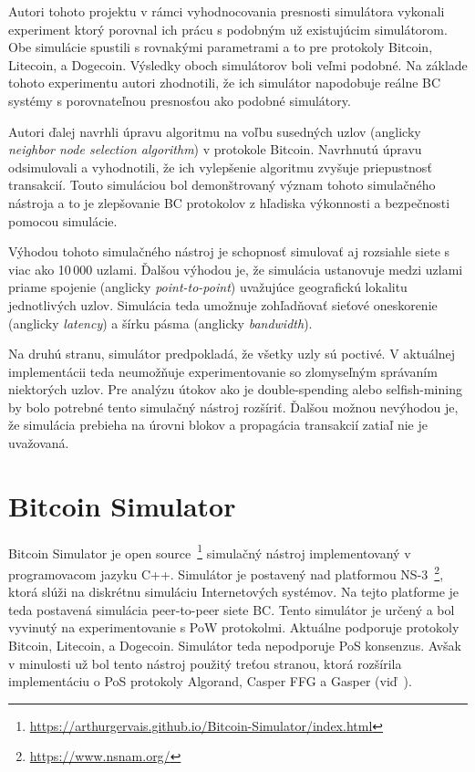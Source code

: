 Autori tohoto projektu v rámci vyhodnocovania presnosti simulátora vykonali experiment ktorý porovnal ich prácu s podobným už existujúcim simulátorom. Obe simulácie spustili s rovnakými parametrami a to pre protokoly Bitcoin, Litecoin, a Dogecoin. Výsledky oboch simulátorov boli veľmi podobné. Na základe tohoto experimentu autori zhodnotili, že ich simulátor napodobuje reálne BC systémy s porovnateľnou presnosťou ako podobné simulátory.

Autori ďalej navrhli úpravu algoritmu na voľbu susedných uzlov (anglicky \textit{neighbor node selection algorithm}) v protokole Bitcoin. Navrhnutú úpravu odsimulovali a vyhodnotili, že ich vylepšenie algoritmu zvyšuje priepustnosť transakcií. Touto simuláciou bol demonštrovaný význam tohoto simulačného nástroja a to je zlepšovanie BC protokolov z hľadiska výkonnosti a bezpečnosti pomocou simulácie.~\cite{simblockWp}

Výhodou tohoto simulačného nástroj je schopnosť simulovať aj rozsiahle siete s viac ako 10\,000 uzlami. Ďalšou výhodou je, že simulácia ustanovuje medzi uzlami priame spojenie (anglicky \textit{point-to-point}) uvažujúce geografickú lokalitu jednotlivých uzlov. Simulácia teda umožnuje zohľadňovať sieťové oneskorenie (anglicky \textit{latency}) a šírku pásma (anglicky \textit{bandwidth}). 

Na druhú stranu, simulátor predpokladá, že všetky uzly sú poctivé. V aktuálnej implementácii teda neumožňuje experimentovanie so zlomyseľným správaním niektorých uzlov. Pre analýzu útokov ako je double-spending alebo selfish-mining by bolo potrebné tento simulačný nástroj rozšíriť. Ďalšou možnou nevýhodou je, že simulácia prebieha na úrovni blokov a propagácia transakcií zatiaľ nie je uvažovaná.~\cite{fanPerfEval}

\section{Bitcoin Simulator}

Bitcoin Simulator je open source~\footnote{\url{https://arthurgervais.github.io/Bitcoin-Simulator/index.html}} simulačný nástroj implementovaný v programovacom jazyku C++. Simulátor je postavený nad platformou NS-3~\footnote{\url{https://www.nsnam.org/}}, ktorá slúži na diskrétnu simuláciu Internetových systémov. Na tejto platforme je teda postavená simulácia peer-to-peer siete BC. Tento simulátor je určený a bol vyvinutý na experimentovanie s PoW protokolmi. Aktuálne podporuje protokoly Bitcoin, Litecoin, a Dogecoin. Simulátor teda nepodporuje PoS konsenzus. Avšak v minulosti už bol tento nástroj použitý treťou stranou, ktorá rozšírila implementáciu o PoS protokoly Algorand, Casper FFG a Gasper (viď~\cite{borcikDp}). 

